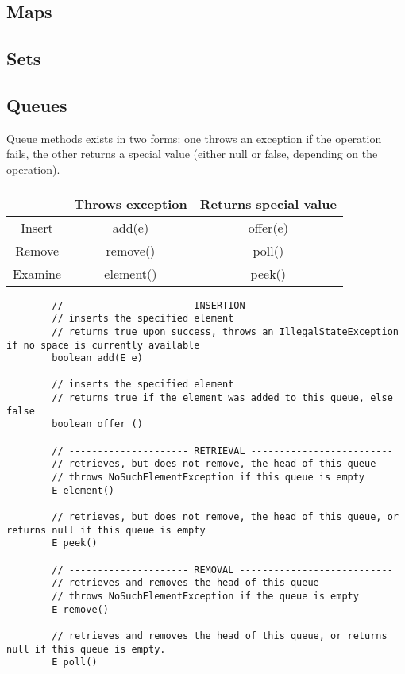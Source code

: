 \documentclass{scrartcl}
\begin{document}
\subsection{Maps}

\subsection{Sets}

\subsection{Queues}

    Queue methods exists in two forms: one throws an exception if the operation fails, the other returns a special value (either null or false, depending on the operation).

    \begin{tabular}{|c|c|c|}
        \hline
        & Throws exception & Returns special value \\
        \hline
        Insert & add(e) & offer(e) \\
        \hline
        Remove & remove() & poll() \\
        \hline
        Examine & element() & peek() \\
        \hline
    \end{tabular}

    \begin{lstlisting}
        // --------------------- INSERTION ------------------------
        // inserts the specified element
        // returns true upon success, throws an IllegalStateException if no space is currently available
        boolean add(E e)

        // inserts the specified element
        // returns true if the element was added to this queue, else false
        boolean offer ()

        // --------------------- RETRIEVAL -------------------------
        // retrieves, but does not remove, the head of this queue
        // throws NoSuchElementException if this queue is empty
        E element()

        // retrieves, but does not remove, the head of this queue, or returns null if this queue is empty
        E peek()

        // --------------------- REMOVAL ---------------------------
        // retrieves and removes the head of this queue
        // throws NoSuchElementException if the queue is empty
        E remove()

        // retrieves and removes the head of this queue, or returns null if this queue is empty.
        E poll()
    \end{lstlisting}
\end{document}
